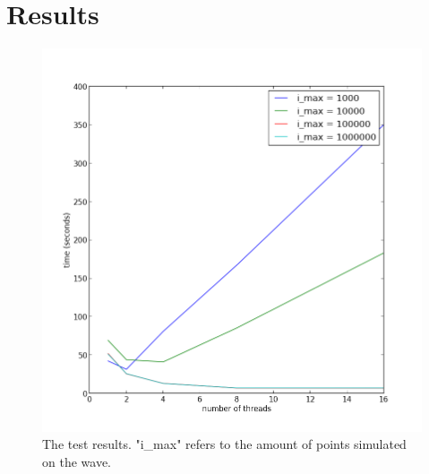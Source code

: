 \documentclass[a4paper]{article}
\begin{document}
\section*{Results}
\begin{figure}[htbp]
    \centering
    \includegraphics[width=\textwidth]{results.png}
    \caption{The test results. "i\_max" refers to the amount of points
    simulated on the wave.}
    \label{fig:results}
\end{figure}
\end{document}
